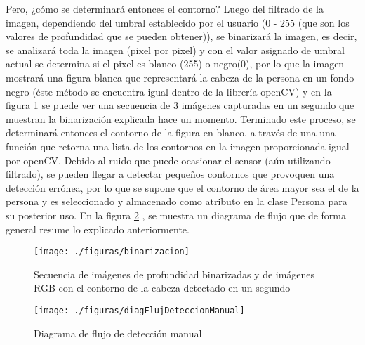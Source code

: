 \documentclass[a4paper,openright,12pt]{report}
\begin{document}
Pero, ¿cómo se determinará entonces el contorno? Luego del filtrado de la imagen, dependiendo del umbral establecido por el usuario (0 - 255 (que son los valores de profundidad que se pueden obtener)), se binarizará la imagen\citep{Gonzalez2006}, es decir, se analizará toda la imagen (pixel por pixel) y con el valor asignado de umbral actual se determina si el pixel es blanco (255) o negro(0), por lo que la imagen mostrará una figura blanca que representará la cabeza de la persona en un fondo negro (éste método se encuentra igual dentro de la librería openCV) y en la figura \ref{fig:binarizacion} se puede ver una secuencia de 3 imágenes capturadas en un segundo que muestran la binarización explicada hace un momento. Terminado este proceso, se determinará entonces el contorno de la figura en blanco, a través de una una función que retorna una lista de los contornos en la imagen proporcionada igual por openCV. Debido al ruido que puede ocasionar el sensor (aún utilizando filtrado), se pueden llegar a detectar pequeños contornos que provoquen una detección errónea, por lo que se supone que el contorno de área mayor sea el de la persona y es seleccionado y almacenado como atributo en la clase Persona para su posterior uso. En la figura \ref{fig:diagFlujDeteccionManual} , se muestra un diagrama de flujo que de forma general resume lo explicado anteriormente.
\begin{figure}[ht]
	\centering
	\texttt{[image: ./figuras/binarizacion]}
	\caption[Secuencia de imágenes de profundidad binarizadas y de imágenes RGB en un segundo]{Secuencia de imágenes de profundidad binarizadas y de imágenes RGB con el contorno de la cabeza detectado en un segundo} \label{fig:binarizacion}
\end{figure}
\begin{figure}[ht]
	\centering
	\texttt{[image: ./figuras/diagFlujDeteccionManual]}
	\caption{Diagrama de flujo de detección manual} \label{fig:diagFlujDeteccionManual}
\end{figure}
\end{document}

